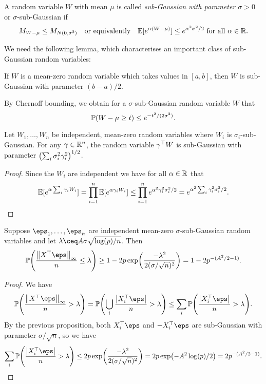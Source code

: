 \begin{definition}
	A random variable  $W$ with mean $\mu$ is called \emph{sub-Gaussian with parameter $\sigma > 0$} or $\sigma$-sub-Gaussian if 
	\[
	M_{W - \mu} \leq M_{N(0, \sigma^2)} \quad\text{or equivalently}\quad \mathbb E[e^{\alpha(W - \mu)}] \leq e^{\alpha^2\sigma^2/2} \text{ for all $\alpha \in \mathbb R$}. 
	\]
\end{definition}

We need the following lemma, which characterises an important class of sub-Gaussian random variables:
\begin{lemma}[Hoeffding]
	If $W$ is a mean-zero random variable which takes values in $[a, b]$, then $W$ is sub-Gaussian with parameter $(b-a)/2$. 
\end{lemma}

By Chernoff bounding, we obtain for a $\sigma$-sub-Gaussian random variable $W$ that \[\mathbb P(W - \mu \geq t) \leq e^{-t^2/(2\sigma^2)}.\]

\begin{proposition}
	Let $W_1, \dotsc, W_n$ be independent, mean-zero random variables where $W_i$ is $\sigma_i$-sub-Gaussian. For any $\gamma \in \mathbb R^n$, the random variable $\gamma^\top W$ is sub-Gaussian with parameter $\qty(\sum_i \sigma_i^2\gamma_i^2)^{1/2}$.
\end{proposition}
\begin{proof}
	Since the $W_i$ are independent we have for all $\alpha \in \mathbb R$ that
	\begin{align*}
		\mathbb E[e^{\alpha \sum_i \gamma_i W_i}] = \prod_{i=1}^n \mathbb E[e^{\alpha \gamma_i W_i}]  \leq \prod_{i=1}^n e^{\alpha^2\gamma_i^2\sigma_i^2/2} = e^{\alpha^2 \sum_i \gamma_i^2\sigma_i^2/2}.
	\end{align*}
\end{proof}

\begin{lemma} \label{lem:probability_omega_bound}
	Suppose $\eps_1, \dotsc, \eps_n$ are independent mean-zero $\sigma$-sub-Gaussian random variables and let $\lambda \ceq A\sigma \sqrt{\log(p)/n}$. Then
	\[
	\PP\qty(\frac{\norm{X\T\eps}_\infty}{n} \leq \lambda) \geq 1 - 2p\exp(\frac{-\lambda^2}{2(\sigma/\sqrt n)^2}) =  1 - 2p^{-(A^2/2 - 1)}. 
	\]
\end{lemma}

\begin{proof}
	We have
	\[
	\PP\qty(\frac{\norm{X\T\eps}_\infty}{n} > \lambda) = \PP\qty(\bigcup_i \frac{\abs{X_i\T\eps}}{n} > \lambda) \leq \sum_i \PP\qty(\frac{\abs{X_i\T\eps}}{n} > \lambda). 
	\]
	By the previous proposition, both $X_i\T\eps$ and $-X_i\T\eps$ are sub-Gaussian with parameter $\sigma/\sqrt n$, so we have
	\[
	\sum_i \PP\qty(\frac{\abs{X_i\T\eps}}{n} > \lambda) \leq 2p \exp(\frac{-\lambda^2}{2(\sigma/\sqrt n)^2}) = 2p\exp(-A^2\log(p)/2) = 2 p^{-(A^2/2 - 1)}.
	\]
\end{proof}

